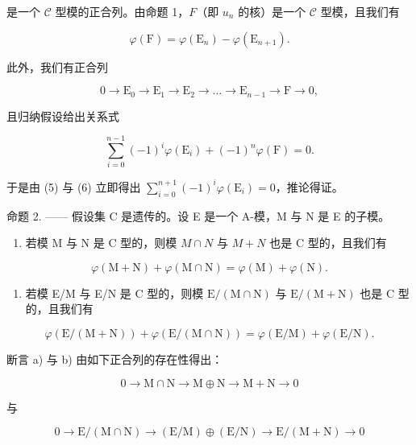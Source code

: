 是一个 \(\mathcal{C}\) 型模的正合列。由命题 1，\(F\)（即 \(u_{n}\) 的核）是一个 \(\mathcal{C}\) 型模，且我们有

\[
\varphi (\mathrm{F}) = \varphi (\mathrm{E} _ {n}) - \varphi (\mathrm{E} _ {n + 1}).\tag{5}
\]

此外，我们有正合列

\[
0 \longrightarrow \mathrm{E} _ {0} \longrightarrow \mathrm{E} _ {1} \longrightarrow \mathrm{E} _ {2} \longrightarrow \dots \longrightarrow \mathrm{E} _ {n - 1} \longrightarrow \mathrm{F} \longrightarrow 0,
\]

且归纳假设给出关系式

\[
\sum_ {i = 0} ^ {n - 1} (- 1) ^ {i} \varphi (\mathrm{E} _ {i}) + (- 1) ^ {n} \varphi (\mathrm{F}) = 0.\tag{6}
\]

于是由 (5) 与 (6) 立即得出 \(\sum_{i=0}^{n+1}(-1)^{i}\varphi(\mathrm{E}_{i}) = 0\)，推论得证。

命题 2. —— 假设集 C 是遗传的。设 E 是一个 A-模，M 与 N 是 E 的子模。

\begin{enumerate}
\def\labelenumi{\alph{enumi})}
\tightlist
\item
  若模 M 与 N 是 C 型的，则模 \(M \cap N\) 与 \(M + N\) 也是 C 型的，且我们有
\end{enumerate}

\[
\varphi (\mathrm{M} + \mathrm{N}) + \varphi (\mathrm{M} \cap \mathrm{N}) = \varphi (\mathrm{M}) + \varphi (\mathrm{N}).
\]

\begin{enumerate}
\def\labelenumi{\alph{enumi})}
\setcounter{enumi}{1}
\tightlist
\item
  若模 E/M 与 E/N 是 C 型的，则模 \(\mathrm{E}/(\mathrm{M}\cap\mathrm{N})\) 与 \(\mathrm{E}/(\mathrm{M}+\mathrm{N})\) 也是 C 型的，且我们有
\end{enumerate}

\[
\varphi (\mathrm{E} / (\mathrm{M} + \mathrm{N})) + \varphi (\mathrm{E} / (\mathrm{M} \cap \mathrm{N})) = \varphi (\mathrm{E} / \mathrm{M}) + \varphi (\mathrm{E} / \mathrm{N}).
\]

断言 a) 与 b) 由如下正合列的存在性得出：

\[
0 \to \mathrm{M} \cap \mathrm{N} \to \mathrm{M} \oplus \mathrm{N} \to \mathrm{M} + \mathrm{N} \to 0
\]

与

\[
0 \to \mathrm{E} / (\mathrm{M} \cap \mathrm{N}) \to (\mathrm{E} / \mathrm{M}) \oplus (\mathrm{E} / \mathrm{N}) \to \mathrm{E} / (\mathrm{M} + \mathrm{N}) \to 0
\]

